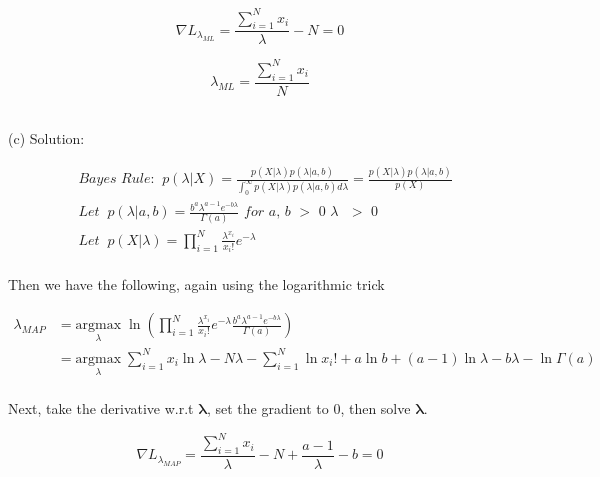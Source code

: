 \documentclass[11pt]{report}
\begin{document}
\begin{equation*}
\nabla{L_{\lambda_{ML}}} = {\frac{\sum_{i=1}^N{x_i}}{\lambda}} - N = 0
\end{equation*}

\begin{equation*}
\lambda_{ML} = {\frac{\sum_{i=1}^N{x_i}}{N}}
\end{equation*}
\\
\begin{flushleft}
(c) Solution: 
\end{flushleft}

\begin{align*} 
& \textit{Bayes Rule:} \;\;  p(\lambda|X) = \frac{p(X|\lambda) p(\lambda|a,b)}{\int_{0}^{\infty} p(X|\lambda) p(\lambda|a,b) d\lambda} = \frac{p(X|\lambda) p(\lambda|a,b)}{p(X)} \\
&\textit{Let} \;\; p(\lambda|a, b)  = \frac{b^a\lambda^{a-1}e^{-b\lambda}}{\Gamma(a)} \textit{ for a, b $>$ 0 $\lambda$ $>$ 0} \\
&\textit{Let} \;\; p(X|\lambda) = \prod_{i=1}^N\frac{\lambda^{x_i}}{x_i!} e^{-\lambda} \\
\end{align*}

\begin{flushleft}
Then we have the following, again using the logarithmic trick
\end{flushleft}

\begin{equation*}
\begin{split}
\lambda_{MAP} & = \underset{\lambda}{\mathrm{argmax}} \; \ln{(\prod_{i=1}^N\frac{\lambda^{x_i}}{x_i!} e^{-\lambda} \frac{b^a\lambda^{a-1}e^{-b\lambda}}{\Gamma(a)})} \\
& = \underset{\lambda}{\mathrm{argmax}} \; {\sum_{i=1}^N{x_i}\ln{\lambda} }  - {N\lambda}  -  {\sum_{i=1}^N\ln{x_i!}} + a\ln{b} + (a-1)\ln{\lambda} - b\lambda - \ln{\Gamma(a)}\\
\end{split}
\end{equation*}

\begin{flushleft}
Next, take the derivative w.r.t $\boldsymbol{\lambda}$, set the gradient to 0, then solve $\boldsymbol{\lambda}$.
\end{flushleft}

\begin{equation*}
\nabla{L_{\lambda_{MAP}}} = {\frac{\sum_{i=1}^N{x_i}}{\lambda}} - N + \frac{a-1}{\lambda} - b = 0
\end{equation*}
\end{document}
